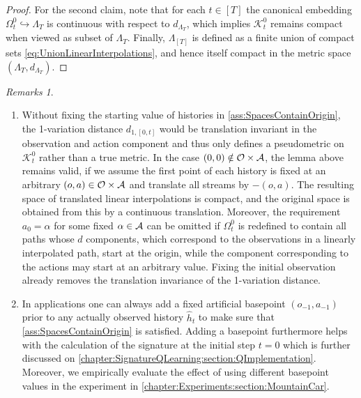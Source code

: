 \documentclass[
    a4paper,
    11pt,
    bibliography=totoc,
    listof=totoc,      
    headinclude=true,
    cleardoublepage=empty,
]{scrbook}
\theoremstyle{plain}
\theoremstyle{definition}
\theoremstyle{remark}
\newtheorem{remarks}[theorem]{Remarks}
\newcommand{\SpaceA}{{\cal A}}
\newcommand{\SpaceO}{{\cal O}}
\begin{document}
\begin{proof}
    For the second claim, note that for each $t\in[T]$ the canonical 
    embedding $\Omega_t^0\hookrightarrow\Lambda_T$ is continuous with 
    respect to $d_{\Lambda_T}$, which implies $\mathcal{K}^0_t$ remains compact when 
    viewed as subset of $\Lambda_T$. Finally, $\Lambda_{[T]}$ is defined as a finite union of compact sets \eqref{eq:UnionLinearInterpolations}, and hence 
    itself compact in the metric space $(\Lambda_T, d_{\Lambda_T})$.
\end{proof}

\begin{remarks}
\label{rem:SpacesContainOrigin}
    \begin{enumerate}
        \item Without fixing the starting value of histories in 
        \cref{ass:SpacesContainOrigin}, the 1-variation distance $d_{1,[0,t]}$ 
        would be translation invariant in the observation and action component 
        and thus only defines a pseudometric on $\mathcal{K}^0_t$ rather than a 
        true metric. In the case $(0,0) \notin \SpaceO\times\SpaceA$, the 
        lemma above remains valid, if we assume the first point of each 
        history is fixed at an arbitrary $(o,a)\in\SpaceO\times\SpaceA$ and 
        translate all streams by $-(o,a)$. The resulting space of translated 
        linear interpolations is compact, and the original space is obtained 
        from this by a continuous translation. Moreover, the requirement 
        $a_0=\alpha$ for some fixed $\alpha\in\SpaceA$ can be omitted if 
        $\Omega_t^0$ is redefined to contain all paths whose $d$ components, 
        which correspond to the observations in a linearly interpolated path, 
        start at the origin, while the component corresponding to the actions 
        may start at an arbitrary value. Fixing the initial observation already 
        removes the translation invariance of the 1-variation distance.
    
        \item In applications one can always add a fixed artificial basepoint 
        $(o_{-1}, a_{-1})$ prior to any actually observed history $\hat h_t$ 
        to make sure that \cref{ass:SpacesContainOrigin} is satisfied. Adding 
        a basepoint furthermore helps with the calculation of the signature at 
        the initial step $t=0$ which is further discussed on 
        \cref{chapter:SignatureQLearning:section:QImplementation}. Moreover, 
        we empirically evaluate the effect of using different basepoint values 
        in the experiment in \cref{chapter:Experiments:section:MountainCar}.
    \end{enumerate}
\end{remarks}
\end{document}
